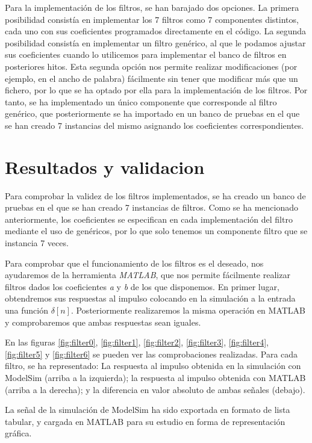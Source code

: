 \documentclass[a4paper,12pt]{article}
\begin{document}
Para la implementación de los filtros, se han barajado dos opciones. La primera posibilidad consistía en implementar los 7 filtros como 7 componentes distintos, cada uno con sus coeficientes programados directamente en el código. La segunda posibilidad consistía en implementar un filtro genérico, al que le podamos ajustar sus coeficientes cuando lo utilicemos para implementar el banco de filtros en posteriores hitos. Esta segunda opción nos permite realizar modificaciones (por ejemplo, en el ancho de palabra) fácilmente sin tener que modificar más que un fichero, por lo que se ha optado por ella para la implementación de los filtros. Por tanto, se ha implementado un único componente que corresponde al filtro genérico, que posteriormente se ha importado en un banco de pruebas en el que se han creado 7 instancias del mismo asignando los coeficientes correspondientes.



\section{Resultados y validacion}

Para comprobar la validez de los filtros implementados, se ha creado un banco de pruebas en el que se han creado 7 instancias de filtros. Como se ha mencionado anteriormente, los coeficientes se especifican en cada implementación del filtro mediante el uso de genéricos, por lo que solo tenemos un componente filtro que se instancia 7 veces.

Para comprobar que el funcionamiento de los filtros es el deseado, nos ayudaremos de la herramienta \emph{MATLAB}, que nos permite fácilmente realizar filtros dados los coeficientes \emph{a} y \emph{b} de los que disponemos. En primer lugar, obtendremos sus respuestas al impulso colocando en la simulación a la entrada una función $\delta[n]$. Posteriormente realizaremos la misma operación en MATLAB y comprobaremos que ambas respuestas sean iguales.

En las figuras \ref{fig:filter0}, \ref{fig:filter1}, \ref{fig:filter2}, \ref{fig:filter3}, \ref{fig:filter4}, \ref{fig:filter5} y \ref{fig:filter6} se pueden ver las comprobaciones realizadas. Para cada filtro, se ha representado: La respuesta al impulso obtenida en la simulación con ModelSim (arriba a la izquierda); la respuesta al impulso obtenida con MATLAB (arriba a la derecha); y la diferencia en valor absoluto de ambas señales (debajo).

La señal de la simulación de ModelSim ha sido exportada en formato de lista tabular, y cargada en MATLAB para su estudio en forma de representación gráfica.
\end{document}
